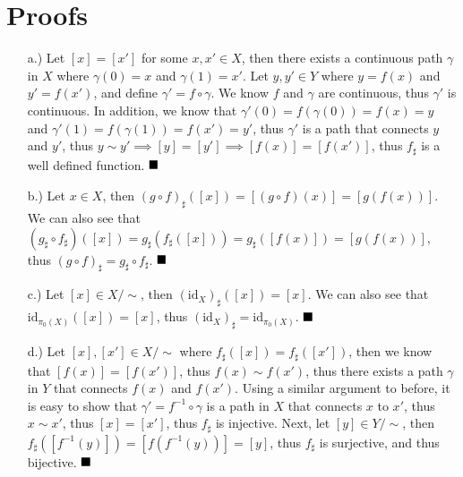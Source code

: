 \documentclass[12pt]{article}
\newcommand{\done}{
    \ensuremath{\strut\hfill\blacksquare}
}
\begin{document}
\section*{Proofs}
\begin{itemize}
    \item [a.)] Let $[x]=[x']$ for some $x,x'\in X$, then there exists a continuous path $\gamma$ in $X$ where $\gamma(0)=x$ and $\gamma(1)=x'$. Let $y,y'\in Y$ where $y=f(x)$ and $y'=f(x')$, and define $\gamma'=f\circ\gamma$. We know $f$ and $\gamma$ are continuous, thus $\gamma'$ is continuous. In addition, we know that $\gamma'(0)=f(\gamma(0))=f(x)=y$ and $\gamma'(1)=f(\gamma(1))=f(x')=y'$, thus $\gamma'$ is a path that connects $y$ and $y'$, thus $y\sim y'\implies[y]=[y']\implies[f(x)]=[f(x')]$, thus $f_\sharp$ is a well defined function. \done

    \item [b.)] Let $x\in X$, then $(g\circ f)_\sharp([x])=[(g\circ f)(x)]=[g(f(x))]$. We can also see that\break$(g_\sharp\circ f_\sharp)([x])=g_\sharp(f_\sharp([x]))=g_\sharp([f(x)])=[g(f(x))]$, thus $(g\circ f)_\sharp=g_\sharp\circ f_\sharp$. \done

    \item [c.)] Let $[x]\in X/{\sim}$, then $(\text{id}_X)_\sharp([x])=[x]$. We can also see that $\text{id}_{\pi_0(X)}([x])=[x]$, thus $(\text{id}_X)_\sharp=\text{id}_{\pi_0(X)}$. \done

    \item [d.)] Let $[x],[x']\in X/{\sim}$ where $f_\sharp([x])=f_\sharp([x'])$, then we know that $[f(x)]=[f(x')]$, thus $f(x)\sim f(x')$, thus there exists a path $\gamma$ in $Y$ that connects $f(x)$ and $f(x')$. Using a similar argument to before, it is easy to show that $\gamma'=f^{-1}\circ\gamma$ is a path in $X$ that connects $x$ to $x'$, thus $x\sim x'$, thus $[x]=[x']$, thus $f_\sharp$ is injective. Next, let $[y]\in Y/{\sim}$, then $f_\sharp([f^{-1}(y)])=[f(f^{-1}(y))]=[y]$, thus $f_\sharp$ is surjective, and thus bijective. \done
\end{itemize}
\end{document}
